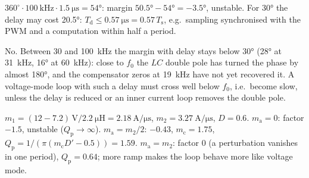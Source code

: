 \begin{solutionblock}
	$360^\circ\cdot\SI{100}{\kilo\hertz}\cdot\SI{1.5}{\micro\second}=\ang{54}$: margin $\ang{50.5}-\ang{54}=\ang{-3.5}$, unstable. For \ang{30} the delay may cost \ang{20.5}: $T_\mathrm{d}\leq\SI{0.57}{\micro\second}=0.57\,T_\mathrm{s}$, e.g.\ sampling synchronised with the PWM and a computation within half a period.
\end{solutionblock}


\begin{solutionblock}
	No. Between 30 and \SI{100}{\kilo\hertz} the margin with delay stays below \ang{30} (\ang{28} at \SI{31}{\kilo\hertz}, \ang{16} at \SI{60}{\kilo\hertz}): close to $f_0$ the $LC$ double pole has turned the phase by almost \ang{180}, and the compensator zeros at \SI{19}{\kilo\hertz} have not yet recovered it. A voltage-mode loop with such a delay must cross well below $f_0$, i.e.\ become slow, unless the delay is reduced or an inner current loop removes the double pole.
\end{solutionblock}




\begin{solutionblock}
	$m_1=(12-7.2)\,\mathrm{V}/\SI{2.2}{\micro\henry}=\SI{2.18}{\ampere\per\micro\second}$, $m_2=\SI{3.27}{\ampere\per\micro\second}$, $D=0.6$.
	$m_\mathrm{a}=0$: factor $-1.5$, unstable ($Q_\mathrm{p}\to\infty$). $m_\mathrm{a}=m_2/2$: $-0.43$, $m_\mathrm{c}=1.75$, $Q_\mathrm{p}=1/(\pi(m_\mathrm{c}D'-0.5))=1.59$. $m_\mathrm{a}=m_2$: factor 0 (a perturbation vanishes in one period), $Q_\mathrm{p}=0.64$; more ramp makes the loop behave more like voltage mode.
\end{solutionblock}


